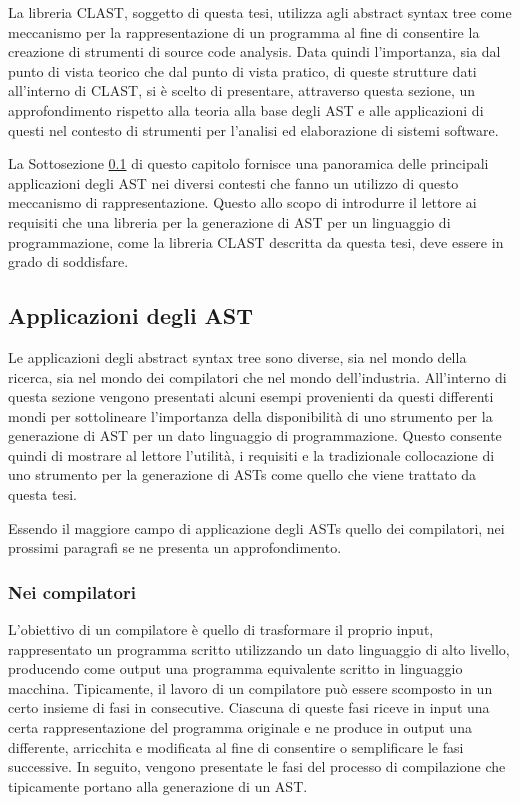 La libreria CLAST, soggetto di questa tesi, utilizza agli abstract syntax tree
come meccanismo per la rappresentazione di un programma al fine di consentire la
creazione di strumenti di source code analysis. Data quindi l'importanza, sia
dal punto di vista teorico che dal punto di vista pratico, di queste strutture
dati all'interno di CLAST, si è scelto di presentare, attraverso questa sezione,
un approfondimento rispetto alla teoria alla base degli AST e alle applicazioni
di questi nel contesto di strumenti per l'analisi ed elaborazione di sistemi
software.

La Sottosezione \ref{ast-applications} di questo capitolo fornisce una
panoramica delle principali applicazioni degli AST nei diversi contesti che
fanno un utilizzo di questo meccanismo di rappresentazione. Questo allo scopo di
introdurre il lettore ai requisiti che una libreria per la generazione di AST
per un linguaggio di programmazione, come la libreria CLAST descritta da questa
tesi, deve essere in grado di soddisfare.

\subsection{Applicazioni degli AST}
\label{ast-applications}

Le applicazioni degli abstract syntax tree sono diverse, sia nel mondo della
ricerca, sia nel mondo dei compilatori che nel mondo dell’industria. All’interno
di questa sezione vengono presentati alcuni esempi provenienti da questi
differenti mondi per sottolineare l’importanza della disponibilità di uno
strumento per la generazione di AST per un dato linguaggio di programmazione.
Questo consente quindi di mostrare al lettore l’utilità, i requisiti e la
tradizionale collocazione di uno strumento per la generazione di ASTs come
quello che viene trattato da questa tesi.

Essendo il maggiore campo di applicazione degli ASTs quello dei compilatori, nei
prossimi paragrafi se ne presenta un approfondimento.

\subsubsection{Nei compilatori}

L'obiettivo di un compilatore è quello di trasformare il proprio input,
rappresentato un programma scritto utilizzando un dato linguaggio di alto
livello, producendo come output una programma equivalente scritto in linguaggio
macchina. Tipicamente, il lavoro di un compilatore può essere scomposto in un
certo insieme di fasi in consecutive. Ciascuna di queste fasi riceve in input
una certa rappresentazione del programma originale e ne produce in output una
differente, arricchita e modificata al fine di consentire o semplificare le fasi
successive. In seguito, vengono presentate le fasi del processo di compilazione
che tipicamente portano alla generazione di un AST.\\

